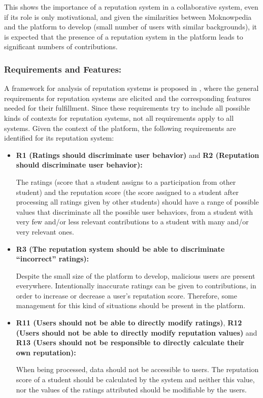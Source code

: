 This shows the importance of a reputation system in a collaborative system, even if its role is only motivational, and given the similarities between Moknowpedia and the platform to develop (small number of users with similar backgrounds), it is expected that the presence of a reputation system in the platform leads to significant numbers of contributions.
	
\subsubsection{Requirements and Features:}

A framework for analysis of reputation systems is proposed in \cite{vavilis2014reference}, where the general requirements for reputation systems are elicited and the corresponding features needed for their fulfillment. Since these requirements try to include all possible kinds of contexts for reputation systems, not all requirements apply to all systems. Given the context of the platform, the following requirements are identified for its reputation system:

\begin{itemize}
\item  \textbf{R1 (Ratings should discriminate user behavior)} and \textbf{R2 (Reputation should discriminate user behavior): }

The ratings (score that a student assigns to a participation from other student) and the reputation score (the score assigned to a student after processing all ratings given by other students) should have a range of possible values that discriminate all the possible user behaviors, from a student with very few and/or less relevant contributions to a student with many and/or very relevant ones.

\item \textbf{R3 (The reputation system should be able to discriminate ``incorrect'' ratings): }

Despite the small size of the platform to develop, malicious users are present everywhere. Intentionally inaccurate ratings can be given to contributions, in order to increase or decrease a user's reputation score. Therefore, some management for this kind of situations should be present in the platform.

\item \textbf{R11 (Users should not be able to directly modify ratings)}, \textbf{R12 (Users should not be able to directly modify reputation values)} and \textbf{R13 (Users should not be responsible to directly calculate their own reputation): }

When being processed, data should not be accessible to users. The reputation score of a student should be calculated by the system and neither this value, nor the values of the ratings attributed should be modifiable by the users.
\end{itemize}

